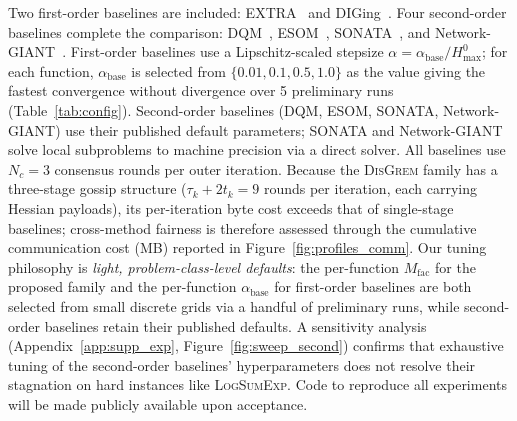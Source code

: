 \documentclass[review,onefignum,onetabnum]{siamart171218}
\begin{document}
	Two first-order baselines are included:
	EXTRA~\citep{shi2015extra} and
	DIGing~\citep{nedic2017diging}.
	Four second-order baselines complete the comparison:
	DQM~\citep{eisen2017dqn},
	ESOM~\citep{mokhtari2016esom},
	SONATA~\citep{sun2022sonata}, and
	Network-GIANT~\citep{maritan2023networkgiant}.
	First-order baselines use a Lipschitz-scaled stepsize
	$\alpha=\alpha_{\mathrm{base}}/H_{\max}^{0}$;
	for each function, $\alpha_{\mathrm{base}}$ is selected from
	$\{0.01, 0.1, 0.5, 1.0\}$ as the value giving the fastest
	convergence without divergence over 5 preliminary runs
	(Table~\ref{tab:config}).
	Second-order baselines (DQM, ESOM, SONATA, Network-GIANT) use their
	published default parameters; SONATA and Network-GIANT solve local
	subproblems to machine precision via a direct solver.
	All baselines use $N_c{=}3$ consensus rounds per outer iteration.
	Because the \textsc{DisGrem} family has a three-stage gossip
	structure ($\tau_k{+}2t_k=9$ rounds per iteration, each carrying
	Hessian payloads), its per-iteration byte cost exceeds that of
	single-stage baselines; cross-method fairness is therefore assessed
	through the cumulative communication cost (MB) reported in
	Figure~\ref{fig:profiles_comm}.
	Our tuning philosophy is \emph{light, problem-class-level defaults}:
	the per-function $M_{\mathrm{fac}}$ for the proposed family and the
	per-function $\alpha_{\mathrm{base}}$ for first-order baselines are
	both selected from small discrete grids via a handful of preliminary
	runs, while second-order baselines retain their published defaults.
	A sensitivity analysis (Appendix~\ref{app:supp_exp}, Figure~\ref{fig:sweep_second})
	confirms that exhaustive tuning of the second-order baselines' hyperparameters does not resolve
	their stagnation on hard instances like \textsc{LogSumExp}.
	Code to reproduce all experiments will be made publicly available
	upon acceptance.
	
\end{document}

